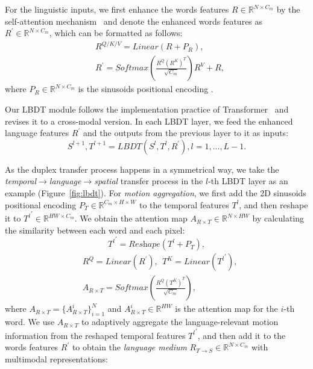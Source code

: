 \documentclass[10pt,twocolumn,letterpaper]{article}
\begin{document}
For the linguistic inputs, we first enhance the words features $R\in \mathbb{R}^{N\times C_m}$ by the self-attention mechanism~\cite{vaswani2017attention} and denote the enhanced words features as $R^{\prime}\in \mathbb{R}^{N\times C_m}$, which can be formatted as follows:
\begin{equation}
\begin{aligned}
    &R^{Q/K/V}=\textit{Linear}(R+P_R),\\
    &R^{\prime}=\textit{Softmax}(\frac{R^Q(R^K)^T}{\sqrt{C_m}})R^V+R,
\end{aligned}
\end{equation}
where $P_R\in \mathbb{R}^{N\times C_m}$ is the sinusoids positional encoding \cite{vaswani2017attention}.

Our LBDT module follows the implementation practice of Transformer~\cite{vaswani2017attention} and revises it to a cross-modal version.
In each LBDT layer, we feed the enhanced language features $R^\prime$ and the outputs from the previous layer to it as inputs:
\begin{equation}
    S^{l+1},T^{l+1}=\textit{LBDT}(S^{l},T^{l},R^\prime), l=1,...,L-1.
\end{equation}

As the duplex transfer process happens in a symmetrical way, we take the \textit{temporal}$\rightarrow$\textit{language}$\rightarrow$\textit{spatial} transfer process in the $l$-th LBDT layer as an example (Figure~\ref{fig:lbdt}). For \textit{motion aggregation}, we first add the 2D sinusoids positional encoding $P_T\in \mathbb{R}^{C_m\times H\times W}$ to the temporal features $T^l$, and then reshape it to ${T^l}^\prime \in \mathbb{R}^{HW\times C_m}$. We obtain the attention map $A_{R\times T}\in \mathbb{R}^{N\times HW}$ by calculating the similarity between each word and each pixel:
\begin{equation}
    {T^l}^\prime=\textit{Reshape}(T^l+P_T),
\end{equation}
\begin{equation}
\begin{aligned}
    &R^Q = \textit{Linear}(R^\prime),~~T^K=\textit{Linear}({T^l}^\prime),\\
    &A_{R\times T} = \textit{Softmax}({\frac{R^Q{(T^K)}^T}{\sqrt{C_m}}}),
\end{aligned}
\end{equation}
where $A_{R\times T}=\{A_{R\times T}^i\}_{i=1}^N$ and $A_{R\times T}^i\in \mathbb{R}^{HW}$ is the attention map for the $i$-th word. We use $A_{R\times T}$ to adaptively aggregate the language-relevant motion information from the reshaped temporal features ${T^l}^\prime$, and then add it to the words features $R^\prime$ to obtain the \textit{language medium} $R_{T\rightarrow S}\in \mathbb{R}^{N\times C_m}$ with multimodal representations:
\end{document}
